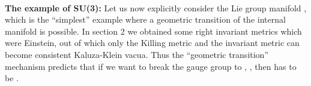 \documentclass[a4paper,12pt]{article}
\begin{document}
\vspace{5mm}
\\ 
{\bf The example of SU(3):} Let us now explicitly consider the Lie group manifold \coordHE{}, which is the ``simplest'' example where a geometric transition of the internal manifold is possible. In section 2 we obtained some right invariant metrics which were Einstein, out of which only the Killing metric and the \coordHE{} invariant metric  can become consistent Kaluza-Klein vacua. Thus the ``geometric transition'' mechanism predicts that if we want to break the  gauge group \coordHE{} to \coordHE{}, \coordHE{}, then \coordHE{} has to be \coordHE{}.
\end{document}
